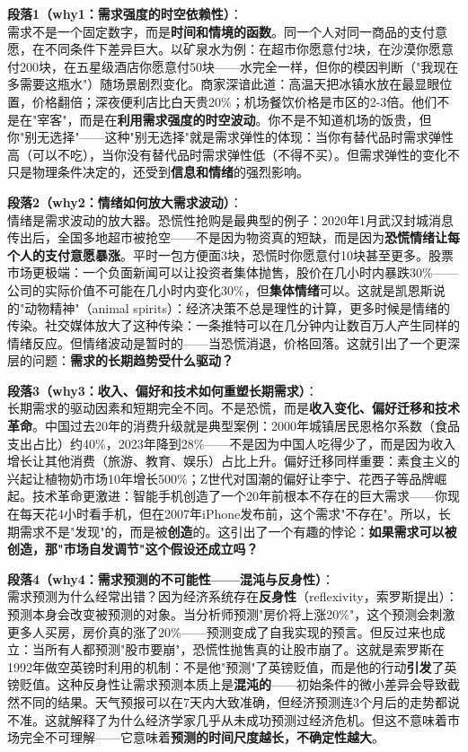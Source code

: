 \documentclass[../main.tex]{subfiles}
\begin{document}
	\textbf{段落1（why1：需求强度的时空依赖性）}：\\
	需求不是一个固定数字，而是\textbf{时间和情境的函数}。同一个人对同一商品的支付意愿，在不同条件下差异巨大。以矿泉水为例：在超市你愿意付2块，在沙漠你愿意付200块，在五星级酒店你愿意付50块——水完全一样，但你的模因判断（"我现在多需要这瓶水"）随场景剧烈变化。商家深谙此道：高温天把冰镇水放在最显眼位置，价格翻倍；深夜便利店比白天贵20\%；机场餐饮价格是市区的2-3倍。他们不是在"宰客"，而是在\textbf{利用需求强度的时空波动}。你不是不知道机场的饭贵，但你"别无选择"——这种"别无选择"就是需求弹性的体现：当你有替代品时需求弹性高（可以不吃），当你没有替代品时需求弹性低（不得不买）。但需求弹性的变化不只是物理条件决定的，还受到\textbf{信息和情绪}的强烈影响。

	\textbf{段落2（why2：情绪如何放大需求波动）}：\\
	情绪是需求波动的放大器。恐慌性抢购是最典型的例子：2020年1月武汉封城消息传出后，全国多地超市被抢空——不是因为物资真的短缺，而是因为\textbf{恐慌情绪让每个人的支付意愿暴涨}。平时一包方便面3块，恐慌时你愿意付10块甚至更多。股票市场更极端：一个负面新闻可以让投资者集体抛售，股价在几小时内暴跌30\%——公司的实际价值不可能在几小时内变化30\%，但\textbf{集体情绪}可以。这就是凯恩斯说的"动物精神"（animal spirits）：经济决策不总是理性的计算，更多时候是情绪的传染。社交媒体放大了这种传染：一条推特可以在几分钟内让数百万人产生同样的情绪反应。但情绪波动是暂时的——当恐慌消退，价格回落。这就引出了一个更深层的问题：\textbf{需求的长期趋势受什么驱动？}

	\textbf{段落3（why3：收入、偏好和技术如何重塑长期需求）}：\\
	长期需求的驱动因素和短期完全不同。不是恐慌，而是\textbf{收入变化、偏好迁移和技术革命}。中国过去20年的消费升级就是典型案例：2000年城镇居民恩格尔系数（食品支出占比）约40\%，2023年降到28\%——不是因为中国人吃得少了，而是因为收入增长让其他消费（旅游、教育、娱乐）占比上升。偏好迁移同样重要：素食主义的兴起让植物奶市场10年增长500\%；Z世代对国潮的偏好让李宁、花西子等品牌崛起。技术革命更激进：智能手机创造了一个20年前根本不存在的巨大需求——你现在每天花4小时看手机，但在2007年iPhone发布前，这个需求"不存在"。所以，长期需求不是"发现"的，而是被\textbf{创造}的。这引出了一个有趣的悖论：\textbf{如果需求可以被创造，那"市场自发调节"这个假设还成立吗？}

	\textbf{段落4（why4：需求预测的不可能性——混沌与反身性）}：\\
	需求预测为什么经常出错？因为经济系统存在\textbf{反身性}（reflexivity，索罗斯提出）：预测本身会改变被预测的对象。当分析师预测"房价将上涨20\%"，这个预测会刺激更多人买房，房价真的涨了20\%——预测变成了自我实现的预言。但反过来也成立：当所有人都预测"股市要崩"，恐慌性抛售真的让股市崩了。这就是索罗斯在1992年做空英镑时利用的机制：不是他"预测"了英镑贬值，而是他的行动\textbf{引发}了英镑贬值。这种反身性让需求预测本质上是\textbf{混沌的}——初始条件的微小差异会导致截然不同的结果。天气预报可以在7天内大致准确，但经济预测连3个月后的走势都说不准。这就解释了为什么经济学家几乎从未成功预测过经济危机。但这不意味着市场完全不可理解——它意味着\textbf{预测的时间尺度越长，不确定性越大}。
\end{document}
